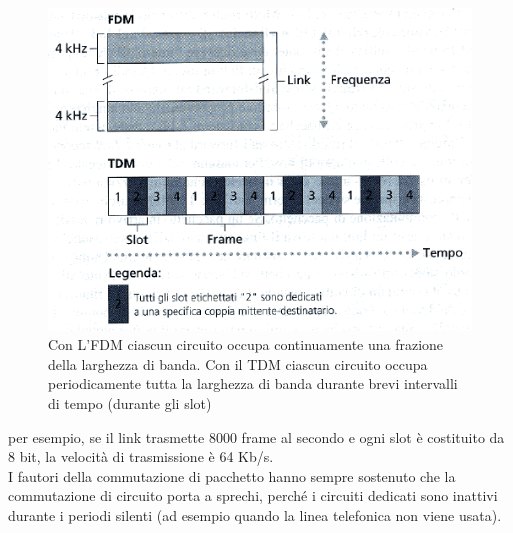 \documentclass[11pt,a4paper]{book}
\begin{document}
\begin{figure}
	\begin{center}
		\includegraphics[scale=0.7]{img/003.png}
		\caption{Con L'FDM ciascun circuito occupa continuamente una frazione della larghezza di banda. Con il TDM ciascun circuito occupa periodicamente tutta la larghezza di banda durante brevi intervalli di tempo (durante gli slot)}
	\end{center}
\end{figure}

per esempio, se il link trasmette 8000 frame al secondo e ogni slot è costituito da 8 bit, la velocità di trasmissione è 64 Kb/s. \\
I fautori della commutazione di pacchetto hanno sempre sostenuto che la commutazione di circuito porta a sprechi, perché i circuiti dedicati sono 	inattivi durante i periodi silenti (ad esempio quando la linea telefonica non viene usata).
\end{document}
